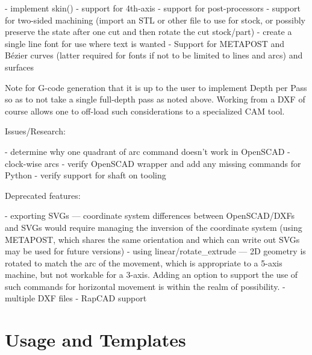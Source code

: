 \documentclass{ltxdoc}
\begin{document}
\begin{readme}
 - implement skin()
 - support for 4th-axis
 - support for post-processors
 - support for two-sided machining (import an STL or other file to use for stock, or possibly preserve the state after one cut and then rotate the cut stock/part)
 - create a single line font for use where text is wanted
 - Support for METAPOST and Bézier curves (latter required for fonts if not to be limited to lines and arcs) and surfaces

Note for G-code generation that it is up to the user to implement Depth per Pass so as to not take a single full-depth pass as noted above. Working from a DXF of course allows one to off-load such considerations to a specialized CAM tool.

Issues/Research:

 - determine why one quadrant of arc command doesn't work in OpenSCAD
 - clock-wise arcs
 - verify OpenSCAD wrapper and add any missing commands for Python
 - verify support for shaft on tooling

Deprecated features:

 - exporting SVGs --- coordinate system differences between OpenSCAD/DXFs and SVGs would require managing the inversion of the coordinate system (using METAPOST, which shares the same orientation and which can write out SVGs may be used for future versions)
 - using linear/rotate_extrude --- 2D geometry is rotated to match the arc of the movement, which is appropriate to a 5-axis machine, but not workable for a 3-axis. Adding an option to support the use of such commands for horizontal movement is within the realm of possibility.
 - multiple DXF files
 - RapCAD support

\end{readme}

%




\clearpage

\section{Usage and Templates}
\end{document}
